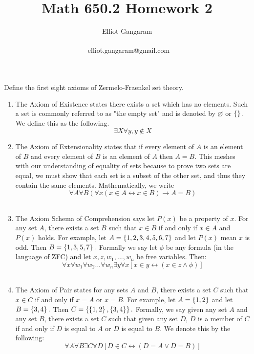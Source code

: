 \documentclass[12pt]{article}
\title{Math 650.2 Homework 2}
\author{Elliot Gangaram\\
\date{}
\ elliot.gangaram@gmail.com \\}
\begin{document}
\maketitle

\problem Define the first eight axioms of Zermelo-Fraenkel set theory.

\begin{enumerate}
\item The Axiom of Existence states there exists a set which has no elements. Such a set is commonly referred to as "the empty set" and is denoted by $\varnothing$ or $\left\{\right\}$. We define this as the following. \begin{equation}
\exists X \forall y, y \notin X
\end{equation}

\item The Axiom of Extensionality states that if every element of $A$ is an element of $B$ and every element of $B$ is an element of $A$ then $A=B$. This meshes with our understanding of equality of sets because to prove two sets are equal, we must show that each set is a subset of the other set, and thus they contain the same elements.  Mathematically, we write \begin{equation}
\forall A \forall B (\forall x(x \in A \leftrightarrow x \in B) \rightarrow A=B)
\end{equation} \\

\item The Axiom Schema of Comprehension says let $P(x)$ be a property of $x$. For any set $A$, there exists a set $B$ such that $x \in B$ if and only if $x \in A$ and $P(x)$ holds. For example, let $A= \left\{1,2,3,4,5,6,7\right\}$ and let $P(x)$ mean $x$ is odd. Then $B= \left\{1,3,5,7\right\}.$ Formally we say let $ \phi$ be any formula (in the language of ZFC) and let $x, z, w_{1}, ..., w_{n}$ be free variables. Then:
\begin{equation}
\forall x \forall w_{1} \forall w_{2} ... \forall w_{n} \exists y \forall x [x \in y \leftrightarrow (x \in z \wedge \phi)]
\end{equation} \\

\item The Axiom of Pair states for any sets $A$ and $B$, there exists a set $C$ such that $x \in C$ if and only if $x=A$ or $x=B$. For example, let $A= \left\{1,2\right\}$ and let $B=\left\{3,4\right\}.$ Then $C= \left\{\left\{1,2\right\},\left\{3,4\right\}\right\}.$  Formally, we say given any set $A$ and any set $B$, there exists a set $C$ such that given any set $D$, $D$ is a member of $C$ if and only if $D$ is equal to $A$ or $D$ is equal to $B$. We denote this by the following: \begin{equation}
 \forall A \forall B \exists C \forall D [D \in C \leftrightarrow (D = A \vee D = B)]
\end{equation} \\


\end{enumerate}
\end{document}
